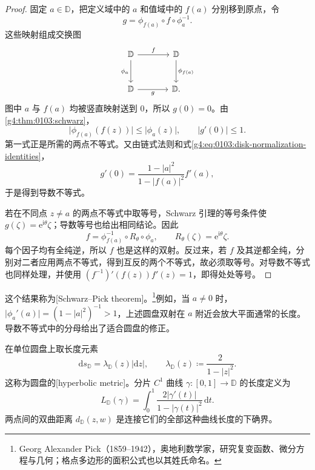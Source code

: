 \begin{proof}
	固定 \(a\in\mathbb D\)，把定义域中的 \(a\) 和值域中的 \(f(a)\) 分别移到原点，令
	\[
		g=\phi_{f(a)}\circ f\circ\phi_a^{-1}.
	\]
	这些映射组成交换图
	\[
		\begin{tikzcd}[column sep=large,row sep=large]
			\mathbb D \arrow[r,"f"] \arrow[d,"\phi_a"']
			& \mathbb D \arrow[d,"\phi_{f(a)}"] \\
			\mathbb D \arrow[r,"g"'] & \mathbb D.
		\end{tikzcd}
	\]
	图中 \(a\) 与 \(f(a)\) 均被竖直映射送到 \(0\)，所以 \(g(0)=0\)。由\cref{g4:thm:0103:schwarz}，
	\[
		\lvert\phi_{f(a)}(f(z))\rvert\leq\lvert\phi_a(z)\rvert,
		\qquad \lvert g'(0)\rvert\leq1.
	\]
	第一式正是所需的两点不等式。又由链式法则和式\eqref{g4:eq:0103:disk-normalization-identities}，
	\[
		g'(0)=\frac{1-\lvert a\rvert^2}{1-\lvert f(a)\rvert^2}f'(a),
	\]
	于是得到导数不等式。

	若在不同点 \(z\ne a\) 的两点不等式中取等号，Schwarz 引理的等号条件使 \(g(\zeta)=\mathrm{e}^{\mathrm{i}\theta}\zeta\)；导数等号也给出相同结论。因此
	\[
		f=\phi_{f(a)}^{-1}\circ R_\theta\circ\phi_a,
		\qquad R_\theta(\zeta)=\mathrm{e}^{\mathrm{i}\theta}\zeta.
	\]
	每个因子均有全纯逆，所以 \(f\) 也是这样的双射。反过来，若 \(f\) 及其逆都全纯，分别对二者应用两点不等式，得到互反的两个不等式，故必须取等号。对导数不等式也同样处理，并使用 \((f^{-1})'(f(z))f'(z)=1\)，即得处处等号。
\end{proof}

这个结果称为[Schwarz--Pick theorem]。\footnote{Georg Alexander Pick（1859--1942），奥地利数学家，研究复变函数、微分方程与几何；格点多边形的面积公式也以其姓氏命名。}例如，当 \(a\ne0\) 时，\(\lvert\phi_a'(a)\rvert=(1-\lvert a\rvert^2)^{-1}>1\)，上述圆盘双射在 \(a\) 附近会放大平面通常的长度。导数不等式中的分母给出了适合圆盘的修正。

\begin{definition}
	\label{g4:def:0103:hyperbolic-distance}
	在单位圆盘上取长度元素
	\[
		\mathrm{d}s_{\mathbb D}=\lambda_{\mathbb D}(z)\lvert\mathrm{d}z\rvert,
		\qquad \lambda_{\mathbb D}(z)\coloneqq\frac2{1-\lvert z\rvert^2}.
	\]
	这称为圆盘的[hyperbolic metric]。分片 \(C^1\) 曲线 \(\gamma\colon[0,1]\rightarrow\mathbb D\) 的长度定义为
	\[
		L_{\mathbb D}(\gamma)=\int_0^1
		\frac{2\lvert\gamma'(t)\rvert}{1-\lvert\gamma(t)\rvert^2}\,\mathrm{d}t.
	\]
	两点间的双曲距离 \(d_{\mathbb D}(z,w)\) 是连接它们的全部这种曲线长度的下确界。
\end{definition}

